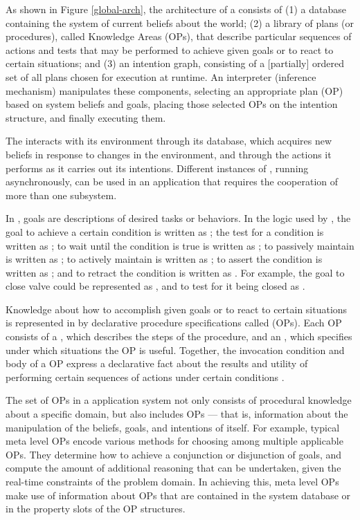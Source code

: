 
As shown in Figure \ref{global-arch}, the architecture of a \CPK{} consists of
(1) a database containing the system of current beliefs about the world; (2) a
library of plans (or procedures), called Knowledge Areas (OPs), that describe
particular sequences of actions and tests that may be performed to achieve
given goals or to react to certain situations; and (3) an intention graph,
consisting of a [partially] ordered set of all plans chosen for execution at
runtime. An interpreter (inference mechanism) manipulates these components,
selecting an appropriate plan (OP) based on system beliefs and goals, placing
those selected OPs on the intention structure, and finally executing them.

The \CPK{} interacts with its environment through its database, which
acquires new beliefs in response to changes in the environment, and through the
actions it performs as it carries out its intentions. Different instances
of \COPRS{}, running asynchronously, can be used in an application that requires
the cooperation of more than one subsystem.

In \COPRS{}, goals are descriptions of desired tasks or behaviors. In the
logic used by \COPRS{}, the goal to achieve a certain condition  is
written as ; the test for a condition  is written as ;
to wait until the condition is true is written as ; to passively
maintain  is written as ; to actively maintain  is
written as ; to assert the condition  is written as
; and to retract the condition  is written as . For example, the goal to close valve  could be represented as
, and to test for it being closed as .

Knowledge about how to accomplish given goals or to react to certain situations
is represented in \COPRS{} by declarative procedure specifications called
 (OPs). Each OP consists of a , which describes
the steps of the procedure, and an , which specifies
under which situations the OP is useful. Together, the invocation condition and
body of a OP express a declarative fact about the results and utility of
performing certain sequences of actions under certain conditions
\cite{Georgeff-Lansky86-a}.

The set of OPs in a \COPRS{} application system not only consists of procedural
knowledge about a specific domain, but also includes  OPs ---
that is, information about the manipulation of the beliefs, goals, and
intentions of \COPRS{} itself. For example, typical meta level OPs encode various
methods for choosing among multiple applicable OPs. They determine how to achieve
a conjunction or disjunction of goals, and compute the amount of additional
reasoning that can be undertaken, given the real-time constraints of the
problem domain. In achieving this, meta level OPs make use of information
about OPs that are contained in the system database or in the property slots of
the OP structures.

